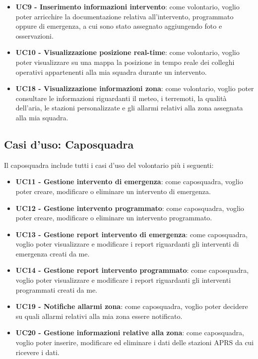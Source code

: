 \begin{itemize}
	\item \textbf{UC9 - Inserimento informazioni intervento}:
	come volontario, voglio poter arricchire la documentazione relativa all'intervento, programmato oppure di emergenza, a cui sono stato assegnato aggiungendo foto e osservazioni.
	
	\item \textbf{UC10 - Visualizzazione posizione real-time}:
	come volontario, voglio poter visualizzare su una mappa la posizione in tempo reale dei colleghi operativi appartenenti alla mia squadra durante un intervento.
	
	\item \textbf{UC18 - Visualizzazione informazioni zona}:
	come volontario, voglio poter consultare le informazioni riguardanti il meteo, i terremoti, la qualità dell'aria, le stazioni personalizzate e gli allarmi relativi alla zona assegnata alla mia squadra.
\end{itemize}




\subsection{Casi d'uso: Caposquadra}
Il caposquadra include tutti i casi d'uso del volontario più i seguenti:
\begin{itemize}
	\item \textbf{UC11 - Gestione intervento di emergenza}:
	come caposquadra, voglio poter creare, modificare o eliminare un intervento di emergenza.
	
	\item \textbf{UC12 - Gestione intervento programmato}:
	come caposquadra, voglio poter creare, modificare o eliminare un intervento programmato.
	
	\item \textbf{UC13 - Gestione report intervento di emergenza}:
	come caposquadra, voglio poter visualizzare e modificare i report riguardanti gli interventi di emergenza creati da me.
	
	\item \textbf{UC14 - Gestione report intervento programmato}:
	come caposquadra, voglio poter visualizzare e modificare i report riguardanti gli interventi programmati creati da me.
		
	\item \textbf{UC19 - Notifiche allarmi zona}:
	come caposquadra, voglio poter decidere su quali  allarmi relativi alla mia zona essere notificato.
	
	\item \textbf{UC20 - Gestione informazioni relative alla zona}:
	come caposquadra, voglio poter inserire, modificare ed eliminare i dati delle stazioni APRS da cui ricevere i dati.
\end{itemize}

